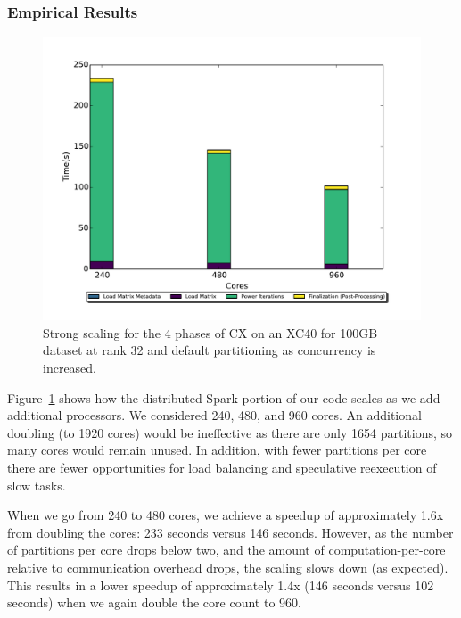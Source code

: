   \subsubsection{Empirical Results}

    \begin{figure} [h!btp]
    \begin{centering}
    \includegraphics[scale=0.4]{images/CX_Strong_Scaling_New_Colors_Axes_Rank_32_Partitions_default.pdf}
    \end{centering}
    \caption{ Strong scaling for the 4 phases of CX on an XC40 for 100GB dataset at rank 32 and default partitioning as concurrency is increased.} 
    \label{fig:xc40scaling}
    \end{figure} 

Figure~\ref{fig:xc40scaling} shows how the distributed Spark portion of our code scales as we add additional processors.  We considered 240, 480, and 960 cores.  An additional doubling (to 1920 cores) would be ineffective as there are only 1654 partitions, so many cores would remain unused.  In addition, with fewer partitions per core there are fewer opportunities for load balancing and speculative reexecution of slow tasks.

When we go from 240 to 480 cores, we achieve a speedup of approximately 1.6x from doubling the cores: 233 seconds versus 146 seconds.  However, as the number of partitions per core drops below two, and the amount of computation-per-core relative to communication overhead drops, the scaling slows down (as expected).  This results in a lower speedup of approximately 1.4x (146 seconds versus 102 seconds) when we again double the core count to 960.

